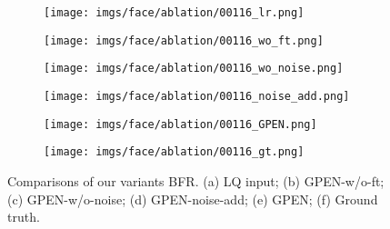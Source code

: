 \documentclass[final]{cvpr}
\begin{document}
\begin{figure*}[ht!]
\centering
\begin{subfigure}[t!]{.16\textwidth}
        \texttt{[image: imgs/face/ablation/00116\_lr.png]}
        \vspace*{-5mm}
        \caption{}
    \end{subfigure} 
    \begin{subfigure}[t!]{.16\textwidth}
        \texttt{[image: imgs/face/ablation/00116\_wo\_ft.png]}
        \vspace*{-5mm}
        \caption{}
    \end{subfigure} 
    \begin{subfigure}[t!]{.16\textwidth}
        \texttt{[image: imgs/face/ablation/00116\_wo\_noise.png]}
        \vspace*{-5mm}
        \caption{}
    \end{subfigure} 
\begin{subfigure}[t!]{.16\textwidth}
        \texttt{[image: imgs/face/ablation/00116\_noise\_add.png]}
        \vspace*{-5mm}
        \caption{}
    \end{subfigure} 
    \begin{subfigure}[t!]{.16\textwidth}
        \texttt{[image: imgs/face/ablation/00116\_GPEN.png]}
        \vspace*{-5mm}
        \caption{}
    \end{subfigure} 
    \begin{subfigure}[t!]{.16\textwidth}
        \texttt{[image: imgs/face/ablation/00116\_gt.png]}
        \vspace*{-5mm}
        \caption{}
    \end{subfigure} 
\vspace*{-3mm}
\caption{Comparisons of our variants BFR. (a) LQ input; (b) GPEN-w/o-ft; (c) GPEN-w/o-noise; (d) GPEN-noise-add; (e) GPEN; (f) Ground truth.} 
\label{fig:ablation}
\vspace*{-3mm}
\end{figure*}
\end{document}
